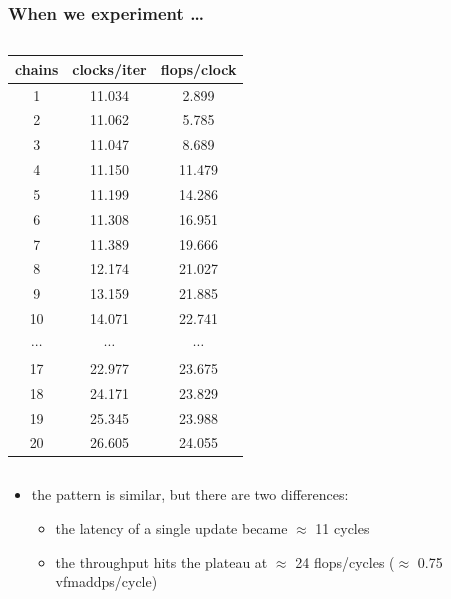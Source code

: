 \documentclass[12pt,dvipdfmx]{beamer}
\newcommand{\mura}[1]{{\color{purple}#1}}
\newcommand{\ao}[1]{{\color{blue}#1}}
\newcommand{\aka}[1]{{\color{red}#1}}
\begin{document}
\begin{frame}
\frametitle{When we experiment \ldots}

\begin{columns}
\begin{column}{0.35\textwidth}
\begin{center}
{\scriptsize
\begin{tabular}{|c|c|c|}\hline
chains & clocks/iter & flops/clock \\
  \hline
1 & \mura{11.034} & 2.899 \\
2 & \mura{11.062} & 5.785 \\
3 & \mura{11.047} & 8.689 \\
4 & \mura{11.150} & 11.479 \\
5 & 11.199 & 14.286 \\
6 & 11.308 & 16.951 \\
7 & 11.389 & 19.666 \\
8 & 12.174 & 21.027 \\
9 & 13.159 & 21.885 \\
10 & 14.071 & 22.741 \\
$\cdots$ & $\cdots$ & $\cdots$ \\
17 & 22.977 & \ao{23.675} \\
18 & 24.171 & \ao{23.829} \\
19 & 25.345 & \ao{23.988} \\
20 & 26.605 & \ao{24.055} \\
\hline
\end{tabular}}
\end{center}
\end{column}

\begin{column}{0.65\textwidth}
\begin{center}
  {\scriptsize }
\end{center}
\end{column}
\end{columns}

\begin{itemize}
\item the pattern is similar, but there are two differences:
  \begin{itemize}
  \item the \aka{latency} of a single update became $\approx$ \aka{11} cycles
  \item the \aka{throughput} hits the plateau at $\approx$ 24 flops/cycles
    ($\approx$ \aka{0.75} vfmaddps/cycle)
  \end{itemize}
\end{itemize}
\end{frame}
\end{document}
